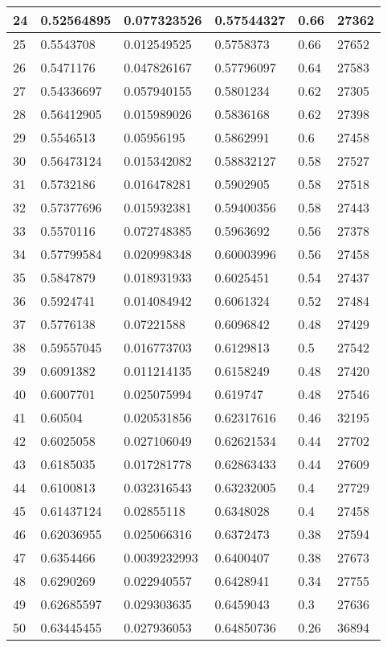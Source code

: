 \begin{longtable}{|l|l|l|l|l|l|}
24 & 0.52564895 & 0.077323526 & 0.57544327 & 0.66 & 27362 \\ \hline 
25 & 0.5543708 & 0.012549525 & 0.5758373 & 0.66 & 27652 \\ \hline 
26 & 0.5471176 & 0.047826167 & 0.57796097 & 0.64 & 27583 \\ \hline 
27 & 0.54336697 & 0.057940155 & 0.5801234 & 0.62 & 27305 \\ \hline 
28 & 0.56412905 & 0.015989026 & 0.5836168 & 0.62 & 27398 \\ \hline 
29 & 0.5546513 & 0.05956195 & 0.5862991 & 0.6 & 27458 \\ \hline 
30 & 0.56473124 & 0.015342082 & 0.58832127 & 0.58 & 27527 \\ \hline 
31 & 0.5732186 & 0.016478281 & 0.5902905 & 0.58 & 27518 \\ \hline 
32 & 0.57377696 & 0.015932381 & 0.59400356 & 0.58 & 27443 \\ \hline 
33 & 0.5570116 & 0.072748385 & 0.5963692 & 0.56 & 27378 \\ \hline 
34 & 0.57799584 & 0.020998348 & 0.60003996 & 0.56 & 27458 \\ \hline 
35 & 0.5847879 & 0.018931933 & 0.6025451 & 0.54 & 27437 \\ \hline 
36 & 0.5924741 & 0.014084942 & 0.6061324 & 0.52 & 27484 \\ \hline 
37 & 0.5776138 & 0.07221588 & 0.6096842 & 0.48 & 27429 \\ \hline 
38 & 0.59557045 & 0.016773703 & 0.6129813 & 0.5 & 27542 \\ \hline 
39 & 0.6091382 & 0.011214135 & 0.6158249 & 0.48 & 27420 \\ \hline 
40 & 0.6007701 & 0.025075994 & 0.619747 & 0.48 & 27546 \\ \hline 
41 & 0.60504 & 0.020531856 & 0.62317616 & 0.46 & 32195 \\ \hline 
42 & 0.6025058 & 0.027106049 & 0.62621534 & 0.44 & 27702 \\ \hline 
43 & 0.6185035 & 0.017281778 & 0.62863433 & 0.44 & 27609 \\ \hline 
44 & 0.6100813 & 0.032316543 & 0.63232005 & 0.4 & 27729 \\ \hline 
45 & 0.61437124 & 0.02855118 & 0.6348028 & 0.4 & 27458 \\ \hline 
46 & 0.62036955 & 0.025066316 & 0.6372473 & 0.38 & 27594 \\ \hline 
47 & 0.6354466 & 0.0039232993 & 0.6400407 & 0.38 & 27673 \\ \hline 
48 & 0.6290269 & 0.022940557 & 0.6428941 & 0.34 & 27755 \\ \hline 
49 & 0.62685597 & 0.029303635 & 0.6459043 & 0.3 & 27636 \\ \hline 
50 & 0.63445455 & 0.027936053 & 0.64850736 & 0.26 & 36894 \\ \hline 
\end{longtable}